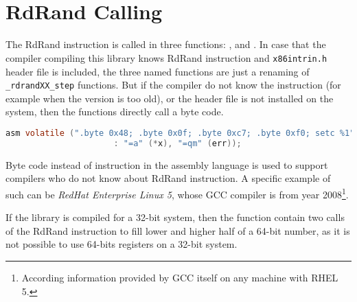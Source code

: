 \\


\\


\section{RdRand Calling}
The RdRand instruction is called in three functions: ,  and . In case that the compiler compiling this library knows RdRand instruction and {\tt x86intrin.h} header file is included, the three named functions are just a renaming of {\tt \_rdrandXX\_step} functions. But if the compiler do not know the instruction (for example when the version is too old), or the header file is not installed on the system, then the functions directly call a byte code.
\begin{lstlisting}[frame=none, basicstyle=\footnotesize\ttfamily, language=C, numbers=none, numberstyle=\tiny\color{black},caption= {Byte code called in {\tt rdrand64\_step}.}]
 asm volatile (".byte 0x48; .byte 0x0f; .byte 0xc7; .byte 0xf0; setc %1"
                      : "=a" (*x), "=qm" (err));
\end{lstlisting}

Byte code instead of instruction in the assembly language is used to support compilers who do not know about RdRand instruction. A specific example of such can be {\em RedHat Enterprise Linux 5}, whose GCC compiler is from year 2008\footnote{According information provided by GCC itself on any machine with RHEL 5.}. 

If the library is compiled for a 32-bit system, then the  function contain two calls of the RdRand instruction to fill lower and higher half of a 64-bit number, as it is not possible to use 64-bits registers on a 32-bit system. 

